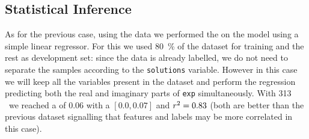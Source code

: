 \subsection{Statistical Inference}

As for the previous case, using the \eda data we performed the \anova on the \wzw model using a simple linear regressor.
For this we used \SI{80}{\percent} of the dataset for training and the rest as development set: since the data is already labelled, we do not need to separate the samples according to the \texttt{solutions} variable.
However in this case we will keep all the variables present in the dataset and perform the regression predicting both the real and imaginary parts of \texttt{exp} simultaneously.
With 313 \dof\ we reached a \mse of 0.06 with a \ci $\left[0.0, 0.07\right]$ and $r^2 = 0.83$ (both are better than the previous dataset signalling that features and labels may be more correlated in this case).

